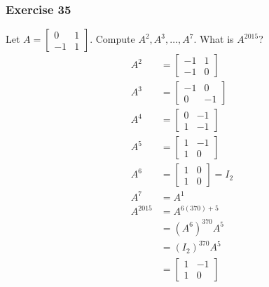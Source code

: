 \documentclass[letterpaper, 12pt]{math}
\begin{document}
\subsubsection*{Exercise 35}
Let \( A = \begin{bmatrix}0 & 1 \\ -1 & 1\end{bmatrix} \). Compute \( A^2,A^3,
\dots,A^7 \). What is \( A^{2015} \)?
\begin{align*}
  A^2 &= \begin{bmatrix}-1 & 1 \\ -1 & 0\end{bmatrix} \\
  A^3 &= \begin{bmatrix}-1 & 0 \\ 0 & -1\end{bmatrix} \\
  A^4 &= \begin{bmatrix}0 & -1 \\ 1 & -1\end{bmatrix} \\
  A^5 &= \begin{bmatrix}1 & -1 \\ 1 & 0\end{bmatrix} \\
  A^6 &= \begin{bmatrix}1 & 0 \\ 1 & 0\end{bmatrix} = I_2 \\
  A^7 &= A^1 \\
  A^{2015} &= A^{6(370)+5} \\
  &= (A^6)^{370}A^5 \\
  &= (I_2)^{370}A^5 \\
  &= \begin{bmatrix}1 & -1 \\ 1 & 0\end{bmatrix}
\end{align*}
\end{document}
